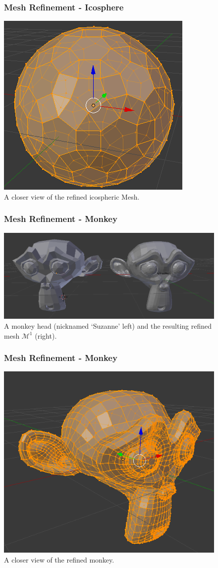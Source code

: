 \documentclass[11pt]{beamer}
\begin{document}
	\begin{frame}
		\begin{figure}
			\frametitle{Mesh Refinement - Icosphere}
			\centering
			\includegraphics[width=.7\linewidth]{img/refine_icosphere_2}
			\caption{A closer view of the refined icospheric Mesh.}		
		\end{figure}
	\end{frame}

	\begin{frame}
		\begin{figure}
			\frametitle{Mesh Refinement - Monkey}
			\centering
			\includegraphics[width=.7\linewidth]{img/refine_monkey}
			\caption{A monkey head (nicknamed `Suzanne' left) and the resulting refined mesh $\mathcal{M}^1$ (right).}			
		\end{figure}
	\end{frame}


	\begin{frame}
		\begin{figure}
			\frametitle{Mesh Refinement - Monkey}
			\centering
			\includegraphics[width=.7\linewidth]{img/refine_monkey_2}
			\caption{A closer view of the refined monkey.}			
		\end{figure}
	\end{frame}
		
\end{document}
